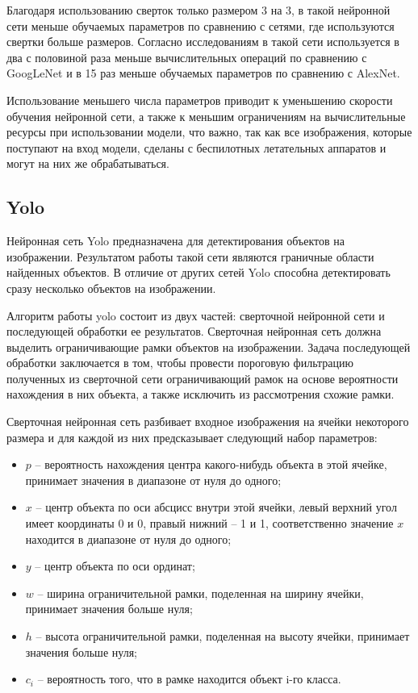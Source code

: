 Благодаря использованию сверток только размером 3 на 3, в такой нейронной сети меньше обучаемых параметров по сравнению с сетями, где используются свертки больше размеров. Согласно исследованиям \cite{mobilenets} в такой сети используется в два с половиной раза меньше вычислительных операций по сравнению с GoogLeNet и в 15 раз меньше обучаемых параметров по сравнению с AlexNet.

Использование меньшего числа параметров приводит к уменьшению скорости обучения нейронной сети, а также к меньшим ограничениям на вычислительные ресурсы при использовании модели, что важно, так как все изображения, которые поступают на вход модели, сделаны с беспилотных летательных аппаратов и могут на них же обрабатываться.

\subsection{Yolo}
Нейронная сеть Yolo предназначена для детектирования объектов на изображении. Результатом работы такой сети являются граничные области найденных объектов. В отличие от других сетей Yolo способна детектировать сразу несколько объектов на изображении.

Алгоритм работы yolo состоит из двух частей: сверточной нейронной сети и последующей обработки ее результатов. Сверточная нейронная сеть должна выделить ограничивающие рамки объектов на изображении. Задача последующей обработки заключается в том, чтобы провести пороговую фильтрацию полученных из сверточной сети ограничивающий рамок на основе вероятности нахождения в них объекта, а также исключить из рассмотрения схожие рамки.

Сверточная нейронная сеть разбивает входное изображения на ячейки некоторого размера и для каждой из них предсказывает следующий набор параметров:
\begin{itemize}
	\item $p$ -- вероятность нахождения центра какого-нибудь объекта в этой ячейке, принимает значения в диапазоне от нуля до одного;
	\item $x$ -- центр объекта по оси абсцисс внутри этой ячейки, левый верхний угол имеет координаты 0 и 0, правый нижний -- 1 и 1, соответственно значение $x$ находится в диапазоне от нуля до одного;
	\item $y$ -- центр объекта по оси ординат;
	\item $w$ -- ширина ограничительной рамки, поделенная на ширину ячейки, принимает значения больше нуля;
	\item $h$ -- высота ограничительной рамки, поделенная на высоту ячейки, принимает значения больше нуля;
	\item $c_i$ -- вероятность того, что в рамке находится объект i-го класса.
\end{itemize}

